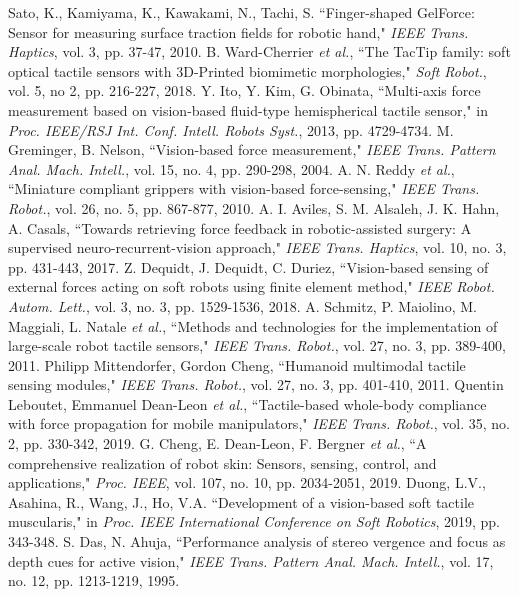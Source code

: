 \documentclass[10pt,letterpaper,journal,final,twoside,twocolumn,nofonttune]{IEEEtran}
\begin{document}
\begin{thebibliography}{1}
Sato, K., Kamiyama, K., Kawakami, N., Tachi, S. ``Finger-shaped GelForce: Sensor for measuring surface traction fields for robotic hand," \emph{IEEE Trans. Haptics}, vol. 3, pp. 37-47, 2010.
B. Ward-Cherrier \emph{et al.}, ``The TacTip family: soft optical tactile sensors with 3D-Printed biomimetic morphologies," \emph{Soft Robot.}, vol. 5, no 2, pp. 216-227, 2018.
Y. Ito, Y. Kim, G. Obinata, ``Multi-axis force measurement based on vision-based fluid-type hemispherical tactile sensor," in \emph{Proc. IEEE/RSJ Int. Conf. Intell. Robots Syst.}, 2013, pp. 4729-4734.
M. Greminger, B. Nelson, ``Vision-based force measurement," \emph{IEEE Trans. Pattern Anal. Mach. Intell.}, vol. 15, no. 4, pp. 290-298, 2004.
A. N. Reddy \emph{et al.}, ``Miniature compliant grippers with vision-based force-sensing," \emph{IEEE Trans. Robot.}, vol. 26, no. 5, pp. 867-877, 2010.
 A. I. Aviles, S. M. Alsaleh, J. K. Hahn, A. Casals, ``Towards retrieving force feedback in robotic-assisted surgery: A supervised neuro-recurrent-vision approach," \emph{IEEE Trans. Haptics}, vol. 10, no. 3, pp. 431-443, 2017.
Z. Dequidt, J. Dequidt, C. Duriez, ``Vision-based sensing of external forces acting on soft robots using finite element method," \emph{IEEE Robot. Autom. Lett.}, vol. 3, no. 3, pp. 1529-1536, 2018.
A. Schmitz, P. Maiolino, M. Maggiali, L. Natale \emph{et al.}, ``Methods and technologies for the implementation of large-scale robot tactile sensors," \emph{IEEE Trans. Robot.}, vol. 27, no. 3, pp. 389-400, 2011.
Philipp Mittendorfer, Gordon Cheng, ``Humanoid multimodal tactile sensing modules," \emph{IEEE Trans. Robot.}, vol. 27, no. 3, pp. 401-410, 2011.
Quentin Leboutet, Emmanuel Dean-Leon \emph{et al.}, ``Tactile-based whole-body compliance with force propagation for mobile manipulators," \emph{IEEE Trans. Robot.}, vol. 35, no. 2, pp. 330-342, 2019. 
G. Cheng, E. Dean-Leon, F. Bergner \emph{et al.}, ``A comprehensive realization of robot skin: Sensors, sensing, control, and applications," \emph{Proc. IEEE}, vol. 107, no. 10, pp. 2034-2051, 2019.
Duong, L.V., Asahina, R., Wang, J., Ho, V.A. ``Development of a vision-based soft tactile muscularis," in \emph{Proc. IEEE International Conference on Soft Robotics}, 2019, pp. 343-348.
S. Das, N. Ahuja, ``Performance analysis of stereo vergence and focus as depth cues for active vision," \emph{IEEE Trans. Pattern Anal. Mach. Intell.}, vol. 17, no. 12, pp. 1213-1219, 1995.

\end{thebibliography}
\end{document}
